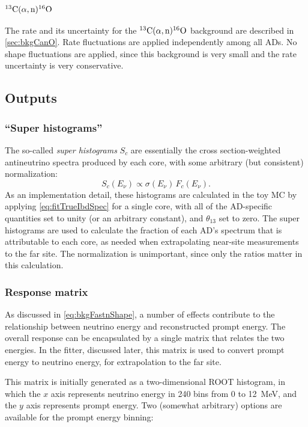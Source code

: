 \documentclass[../thesis.tex]{subfiles}
\begin{document}
\subsubsection{$^{13}\mathrm{C}(\alpha, \mathrm{n})^{16}\mathrm{O}$}

The rate and its uncertainty for the $^{13}\mathrm{C}(\alpha, \mathrm{n})^{16}\mathrm{O}$ background are described in \autoref{sec:bkgCanO}. Rate fluctuations are applied independently among all ADs. No shape fluctuations are applied, since this background is very small and the rate uncertainty is very conservative.

\subsection{Outputs}
\label{sec:fitToyOutputs}

\subsubsection{``Super histograms''}

The so-called \emph{super histograms} $S_c$ are essentially the cross section-weighted antineutrino spectra produced by each core, with some arbitrary (but consistent) normalization:
\begin{equation}
  S_c(E_\nu) \propto \sigma(E_\nu)\,F_c(E_\nu).
\end{equation}
As an implementation detail, these histograms are calculated in the toy MC by applying \autoref{eq:fitTrueIbdSpec} for a single core, with all of the AD-specific quantities set to unity (or an arbitrary constant), and $\theta_{13}$ set to zero. The super histograms are used to calculate the fraction of each AD's spectrum that is attributable to each core, as needed when extrapolating near-site measurements to the far site. The normalization is unimportant, since only the ratios matter in this calculation.

\subsubsection{Response matrix}

As discussed in \autoref{eq:bkgFastnShape}, a number of effects contribute to the relationship between neutrino energy and reconstructed prompt energy. The overall response can be encapsulated by a single matrix that relates the two energies. In the fitter, discussed later, this matrix is used to convert prompt energy to neutrino energy, for extrapolation to the far site.

This matrix is initially generated as a two-dimensional ROOT histogram, in which the $x$ axis represents neutrino energy in 240 bins from 0 to 12~MeV, and the $y$ axis represents prompt energy. Two (somewhat arbitrary) options are available for the prompt energy binning:
\end{document}
